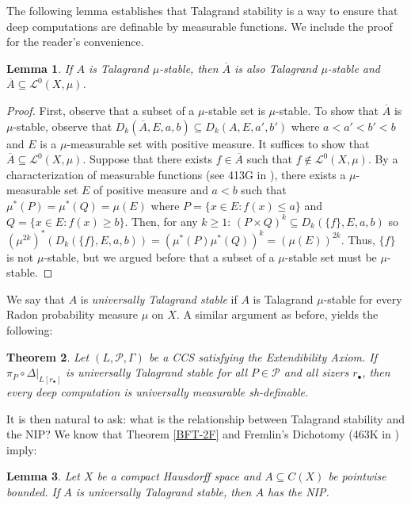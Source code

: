 \documentclass[psamsfonts]{amsart}
\newtheorem{thm}{Theorem}[section]
\newtheorem{lem}[thm]{Lemma}
\theoremstyle{definition}
\theoremstyle{remark}
\numberwithin{equation}{section}
\begin{document}
The following lemma establishes that Talagrand stability is a way to ensure that deep computations are definable by measurable functions. We include the proof for the reader's convenience.

\begin{lem}
    If $A$ is Talagrand $\mu$-stable, then $\overline{A}$ is also Talagrand $\mu$-stable and $\overline{A}\subseteq\mathcal{L}^0(X,\mu)$.
\end{lem}

\begin{proof}
    First, observe that a subset of a $\mu$-stable set is $\mu$-stable. To show that $\overline{A}$ is $\mu$-stable, observe that $D_k(\overline{A},E,a,b)\subseteq D_k(A,E,a',b')$ where $a<a'<b'<b$ and $E$ is a $\mu$-measurable set with positive measure. It suffices to show that $\overline{A}\subseteq \mathcal{L}^0(X,\mu)$. Suppose that there exists $f\in\overline{A}$ such that $f\notin \mathcal{L}^0(X,\mu)$. By a characterization of measurable functions (see 413G in \cite{fremlin2003vol4}), there exists a $\mu$-measurable set $E$ of positive measure and $a<b$ such that $\mu^*(P)=\mu^*(Q)=\mu(E)$ where $P=\{x\in E: f(x)\leq a\}$ and $Q=\{x\in E: f(x)\geq b\}$. Then, for any $k\geq 1$: $(P\times Q)^k\subseteq D_k(\{f\},E,a,b)$ so $(\mu^{2k})^*(D_k(\{f\},E,a,b))=(\mu^*(P)\mu^*(Q))^k=(\mu(E))^{2k}$. Thus, $\{f\}$ is not $\mu$-stable, but we argued before that a subset of a $\mu$-stable set must be $\mu$-stable.
\end{proof}

We say that $A$ is \emph{universally Talagrand stable} if $A$ is Talagrand $\mu$-stable for every Radon probability measure $\mu$ on $X$. A similar argument as before, yields the following:

\begin{thm}
    Let $(L,\mathcal P,\Gamma)$ be a CCS satisfying the Extendibility Axiom. If $\pi_P\circ\Delta|_{L[r_\bullet]}$ is universally Talagrand stable for all $P\in\mathcal{P}$ and all sizers $r_{\bullet}$, then every deep computation is universally measurable sh-definable.
\end{thm}

It is then natural to ask: what is the relationship between Talagrand stability and the NIP? We know that Theorem \ref{BFT-2F} and Fremlin's Dichotomy (463K in \cite{fremlin2003vol4}) imply:

\begin{lem}
    Let $X$ be a compact Hausdorff space and $A\subseteq C(X)$ be pointwise bounded. If $A$ is universally Talagrand stable, then $A$ has the NIP.
\end{lem}
\end{document}
